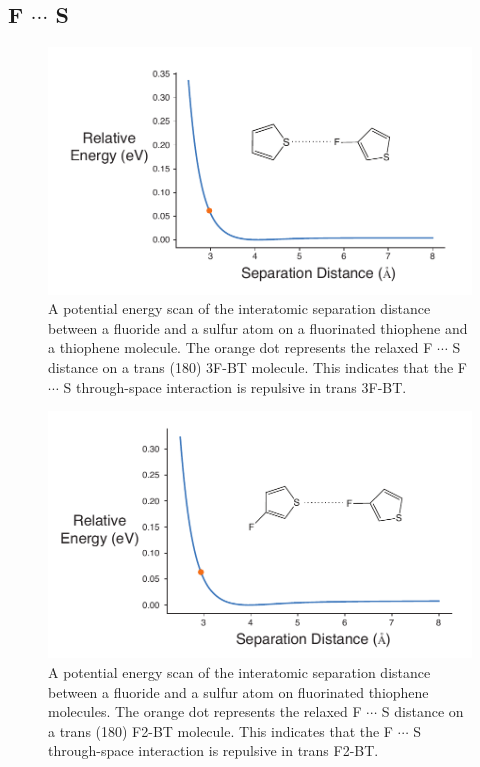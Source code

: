 \subsection{\texorpdfstring{F $\cdots$ S}{FS}}
\begin{figure}[hbt!]
    \centering
    \includegraphics{figures/append_aroma/ts_t_t_f1_copy.pdf}
    \caption[\texorpdfstring{F $\cdots$ S}{FS} 1F Through-space Calculation]{A potential energy scan of the interatomic separation distance between a fluoride and a sulfur atom on a fluorinated thiophene and a thiophene molecule. The orange dot represents the relaxed F $\cdots$ S distance on a trans (180\textdegree) 3F-BT molecule. This indicates that the F $\cdots$ S through-space interaction is repulsive in trans 3F-BT.}
    \label{fig:ts_t_t_f1}
\end{figure}

\begin{figure}[hbt!]
    \centering
    \includegraphics{figures/append_aroma/ts_2t_f1_copy.pdf}
    \caption[\texorpdfstring{F $\cdots$ S}{FS} 2F Through-space Calculation]{A potential energy scan of the interatomic separation distance between a fluoride and a sulfur atom on fluorinated thiophene molecules. The orange dot represents the relaxed F $\cdots$ S distance on a trans (180\textdegree) F2-BT molecule. This indicates that the F $\cdots$ S through-space interaction is repulsive in trans F2-BT.}
    \label{fig:ts_2t_f1}
\end{figure}
\clearpage

